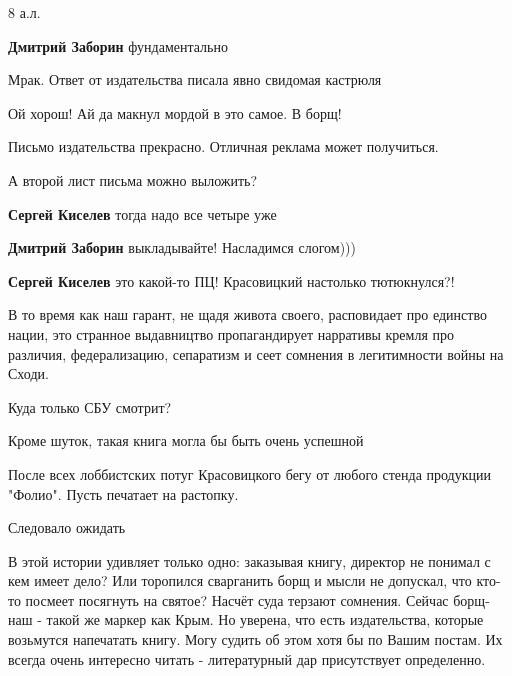 \begin{itemize}
\begin{itemize} %
8 а.л.

\textbf{Дмитрий Заборин} фундаментально
\end{itemize} %

Мрак. Ответ от издательства писала явно свидомая кастрюля

Ой хорош! Ай да макнул мордой в это самое. В борщ!


Письмо издательства прекрасно. Отличная реклама может получиться.

А второй лист письма можно выложить?

\begin{itemize} %
\textbf{Сергей Киселев} тогда надо все четыре уже

\textbf{Дмитрий Заборин} выкладывайте! Насладимся слогом)))

\textbf{Сергей Киселев} это какой-то ПЦ! Красовицкий настолько тютюкнулся?!
\end{itemize} %


В то время как наш гарант, не щадя живота своего, расповидает про единство
нации, это странное выдавництво пропагандирует нарративы кремля про различия,
федерализацию, сепаратизм и сеет сомнения в легитимности войны на Сходи.

Куда только СБУ смотрит?

Кроме шуток, такая книга могла бы быть очень успешной

После всех лоббистских потуг Красовицкого бегу от любого стенда продукции "Фолио". Пусть печатает на растопку.

Следовало ожидать


В этой истории удивляет только одно: заказывая книгу, директор не понимал с кем
имеет дело? Или торопился сварганить борщ и мысли не допускал, что кто-то
посмеет посягнуть на святое? Насчёт суда терзают сомнения. Сейчас борщ-наш -
такой же маркер как Крым. Но уверена, что есть издательства, которые возьмутся
напечатать книгу. Могу судить об этом хотя бы по Вашим постам. Их всегда очень
интересно читать - литературный дар присутствует определенно.



\end{itemize}
